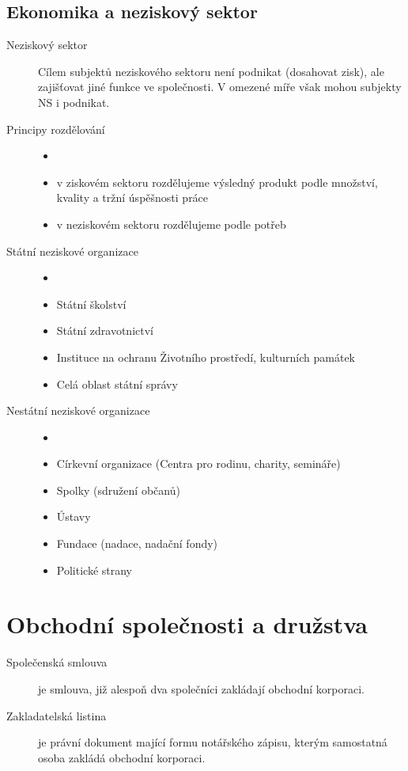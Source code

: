 \documentclass[11pt,a4paper,twoside]{book}
\begin{document}
	\section*{Ekonomika a neziskový sektor}
		\begin{description}
			\item[Neziskový sektor] Cílem subjektů neziskového sektoru není podnikat (dosahovat zisk), ale zajišťovat jiné funkce ve společnosti. V omezené míře však mohou subjekty NS i podnikat.
			\item[Principy rozdělování]
				\begin{itemize}
					\item []
					\item v ziskovém sektoru rozdělujeme výsledný produkt podle množství, kvality a tržní úspěšnosti práce
					\item v neziskovém sektoru rozdělujeme podle potřeb
				\end{itemize}
			\item[Státní neziskové organizace]
				\begin{itemize}
					\item []
					\item Státní školství
					\item Státní zdravotnictví
					\item Instituce na ochranu Životního prostředí, kulturních památek
					\item Celá oblast státní správy
				\end{itemize}
			\item[Nestátní neziskové organizace]
				\begin{itemize}
					\item []
					\item Církevní organizace (Centra pro rodinu, charity, semináře)
					\item Spolky (sdružení občanů)
					\item Ústavy
					\item Fundace (nadace, nadační fondy)
					\item Politické strany
				\end{itemize}
		\end{description}
	\chapter{Obchodní společnosti a družstva}

	\begin{description}
		\item[Společenská smlouva] je smlouva, již alespoň dva společníci zakládají obchodní korporaci.
		\item[Zakladatelská listina] je právní dokument mající formu notářského zápisu, kterým samostatná osoba zakládá obchodní korporaci.
	\end{description}
\end{document}
